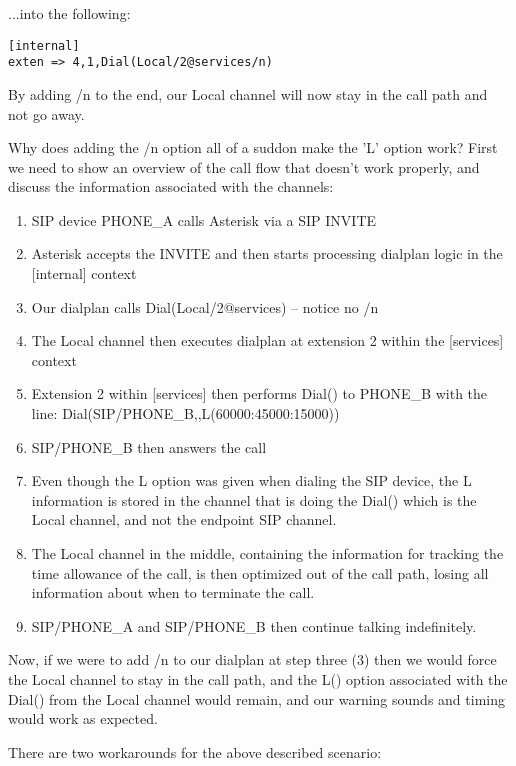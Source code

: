 ...into the following:

\begin{verbatim}
[internal]
exten => 4,1,Dial(Local/2@services/n)
\end{verbatim}

By adding /n to the end, our Local channel will now stay in the call path and
not go away.

Why does adding the /n option all of a suddon make the 'L' option work? First
we need to show an overview of the call flow that doesn't work properly, and
discuss the information associated with the channels:

\begin{enumerate}
  \item SIP device PHONE\_A calls Asterisk via a SIP INVITE
  \item Asterisk accepts the INVITE and then starts processing dialplan logic in the [internal] context
  \item Our dialplan calls Dial(Local/2@services) -- notice no /n
  \item The Local channel then executes dialplan at extension 2 within the [services] context
  \item Extension 2 within [services] then performs Dial() to PHONE_B with the line:  Dial(SIP/PHONE\_B,,L(60000:45000:15000))
  \item SIP/PHONE\_B then answers the call
  \item Even though the L option was given when dialing the SIP device, the L information is stored in the channel that is doing the Dial() which is the Local channel, and not the endpoint SIP channel.
  \item The Local channel in the middle, containing the information for tracking the time allowance of the call, is then optimized out of the call path, losing all information about when to terminate the call.
  \item SIP/PHONE\_A and SIP/PHONE\_B then continue talking indefinitely.
\end{enumerate}

Now, if we were to add /n to our dialplan at step three (3) then we would force the
Local channel to stay in the call path, and the L() option associated with the
Dial() from the Local channel would remain, and our warning sounds and timing
would work as expected.

There are two workarounds for the above described scenario:

